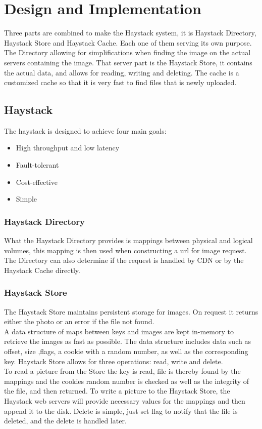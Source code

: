 \section{Design and Implementation}
 Three parts are combined to make the Haystack system, it is
 Haystack Directory, Haystack Store and Haystack Cache.
 Each one of them serving its own purpose. The Directory allowing for
 simplifications when finding the image on the actual servers containing the
 image. That server part is the Haystack Store, it contains the actual data, and
 allows for reading, writing and deleting. The cache is a customized cache so that
 it is very fast to find files that is newly uploaded.

\subsection{Haystack}
The haystack is designed to achieve four main goals:
\begin{itemize}
  \item High throughput and low latency
  \item Fault-tolerant
  \item Cost-effective
  \item Simple
\end{itemize} 

\subsubsection{Haystack Directory}
  What the Haystack Directory provides is mappings between physical and logical
  volumes, this mapping is then used when constructing a url for image request.
  The Directory can also determine if the request is handled by CDN or by the 
  Haystack Cache directly. 
  
\subsubsection{Haystack Store}
 The Haystack Store maintains persistent storage for images. On request it returns
 either the photo or an error if the file not found. \\
 A data structure of maps between keys and images are kept in-memory to retrieve
 the images as fast as possible. The data structure includes data such as offset,
 size ,flags, a cookie with a random number, as well as the corresponding key. 
 Haystack Store allows for three operations: read, write and delete.\\
 To read a picture from the Store the key is read, file is thereby found by the mappings
 and the cookies random number is checked as well as the integrity of the file, and then
 returned. To write a picture to the Haystack Store, the Haystack web servers will provide
 necessary values for the mappings and then append it to the disk.
 Delete is simple, just set flag to notify that the file is deleted, and the delete
 is handled later.
  
